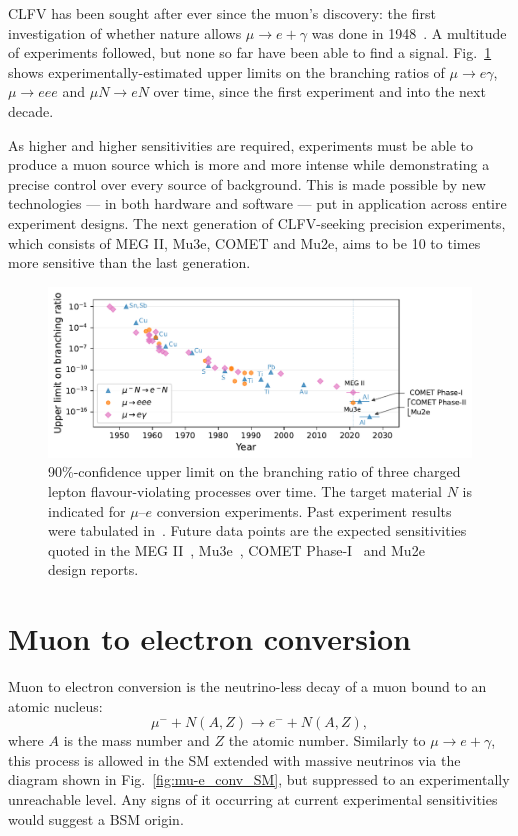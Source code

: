 CLFV has been sought after ever since the muon's discovery: the first
investigation of whether nature allows $\mu \rightarrow e + \gamma$ was done in
1948~\cite{PhysRev.73.257}. A multitude of experiments followed, but none so far
have been able to find a signal. Fig.~\ref{fig:clfv_upper_limit} shows
experimentally-estimated upper limits on the branching ratios of $\mu
\rightarrow e\gamma$, $\mu\rightarrow eee$ and $\mu N \rightarrow e N$ over
time, since the first experiment and into the next decade. 

As higher and higher sensitivities are required, experiments must be able to
produce a muon source which is more and more intense while demonstrating a
precise control over every source of background. This is made possible by new
technologies --- in both hardware and software --- put in application across
entire experiment designs. The next generation of CLFV-seeking precision
experiments, which consists of MEG II, Mu3e, COMET and Mu2e, aims to be 10 to
 times more sensitive than the last generation.

\begin{figure}
    \centering
    \includegraphics[width=\textwidth]{chapter1/clfv_upper_limit_v2.pdf}
    \caption{
        90\%-confidence upper limit on the branching ratio of three charged
        lepton flavour-violating processes over time. 
        The target material $N$ is indicated for $\mu$--$e$ conversion experiments.
        Past experiment results
        were tabulated in~\cite{BERNSTEIN201327}. Future data points are the
        expected sensitivities quoted in the MEG II~\cite{Baldini2018},
        Mu3e~\cite{ARNDT2021165679}, COMET
        Phase-I~\cite{the_comet_collaboration_comet_2020} and
        Mu2e~\cite{bartoszek2015mu2e} design reports.
    }
    \label{fig:clfv_upper_limit}
\end{figure}

\section{Muon to electron conversion}
Muon to electron conversion is the neutrino-less decay of a muon bound to an
atomic nucleus:
$$
\mu^- + N(A, Z) \rightarrow e^- + N(A, Z),
$$
where $A$ is the mass number and $Z$ the atomic number.
Similarly to $\mu\rightarrow e+\gamma$, this process is allowed in the SM
extended with massive neutrinos via the diagram shown in
Fig.~\ref{fig:mu-e_conv_SM}, but suppressed to an experimentally
unreachable level. Any signs of it occurring at current experimental
sensitivities would suggest a BSM origin.

